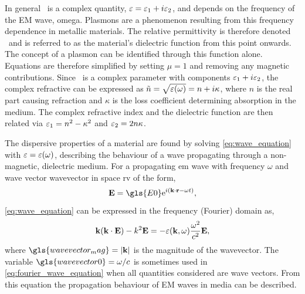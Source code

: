 \documentclass{article}
\begin{document}
In general \eps\ is a complex quantity, $\varepsilon=\varepsilon_1+i\varepsilon_2$, and depends on the frequency of the EM wave, \gls{omega}. Plasmons are a phenomenon resulting from this frequency dependence in metallic materials. The relative permittivity is therefore denoted \dielectric\ and is referred to as the material's dielectric function from this point onwards. The concept of a plasmon can be identified through this function alone. Equations are therefore simplified by setting $\mu=1$ and removing any magnetic contributions.
Since \dielectric\ is a complex parameter with components $\varepsilon_1+i\varepsilon_2$, the complex refractive can be expressed as $\tilde{n}=\sqrt{\varepsilon(\omega)}=n+i\kappa$, where $n$ is the real part causing refraction and $\kappa$ is the loss coefficient determining absorption in the medium. The complex refractive index and the dielectric function are then related via $\varepsilon_1=n^2-\kappa^2$ and $\varepsilon_2 = 2n\kappa$.

The dispersive properties of a material are found by solving \eqref{eq:wave_equation} with $\varepsilon=\varepsilon(\omega)$, describing the behaviour of a wave propagating through a non-magnetic, dielectric medium. For a propagating \gls{em} wave with frequency $\omega$ and wave vector \gls{wavevector} in space \gls{rv} of the form,
\begin{equation}
	\vec{E} = \gls{E0} \e^{i(\wv \cdot \vec{r} - \omega t)},
	\label{eq:wave}
\end{equation}
\eqref{eq:wave_equation} can be expressed in the frequency (Fourier) domain as,%
\begin{equation}
	\mathbf{k}(\mathbf{k}\cdot\mathbf{E}) - k^2\mathbf{E} = -\varepsilon(\mathbf{k}, \omega) \frac{\omega^2}{c^2}\mathbf{E},
	\label{eq:fourier_wave_equation}
\end{equation}
where $\gls{wavevector_mag}=|\wv|$ is the magnitude of the wavevector. The variable $\gls{wavevector0} = \omega/c$ is sometimes used in \eqref{eq:fourier_wave_equation} when all quantities considered are wave vectors. From this equation the propagation behaviour of EM waves in media can be described.
\end{document}

